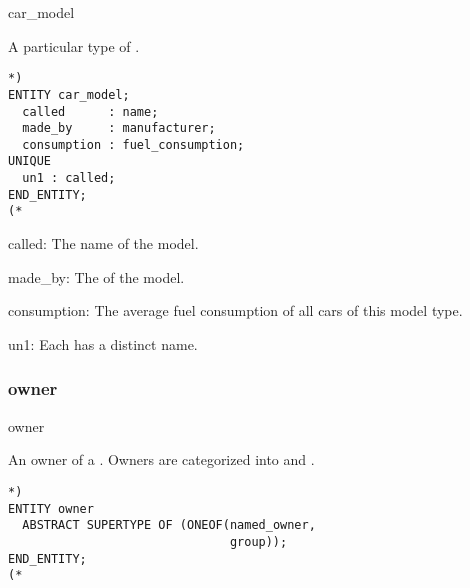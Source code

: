 \documentclass{article}
\begin{document}
\begin{Mnamedesc}{car_model}
\begin{Mdesctext}
    A particular type of .
\end{Mdesctext}

\begin{Mexp}
\begin{verbatim}
*)
ENTITY car_model;
  called      : name;
  made_by     : manufacturer;
  consumption : fuel_consumption;
UNIQUE
  un1 : called;
END_ENTITY;
(*
\end{verbatim}
\end{Mexp}

\begin{Matts}

\item[called:] The name of the model.

\item[made\_by:] The  of the model.

\item[consumption:] The average fuel consumption of all cars of this model
type.

\end{Matts}

\begin{Mprops}

\item[un1:] Each  has a distinct name.
\end{Mprops}
\end{Mnamedesc}

\subsubsection{owner}

\begin{Mnamedesc}{owner}
\begin{Mdesctext}
    An owner of a . Owners are categorized into 
and .
\end{Mdesctext}

\begin{Mexp}
\begin{verbatim}
*)
ENTITY owner
  ABSTRACT SUPERTYPE OF (ONEOF(named_owner,
                               group));
END_ENTITY;
(*
\end{verbatim}
\end{Mexp}
\end{Mnamedesc}
\end{document}
